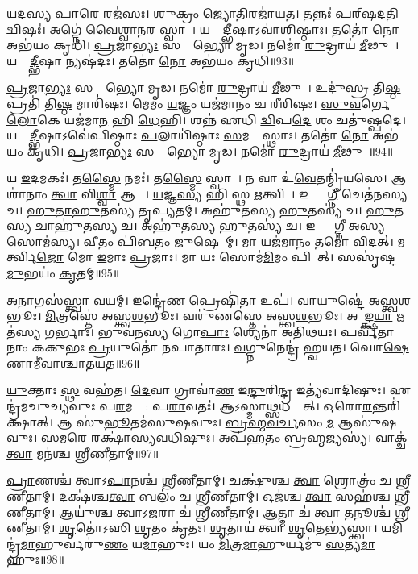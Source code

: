 𑌯\ul{𑌦}𑌸𑍍𑌯 \ul{𑌪𑌾}𑌰𑍇 𑌰𑌜॑𑌸𑌃।
\ul{𑌶𑍁}𑌕𑍍𑌰𑌂  𑌜𑍍𑌯𑍋\ul{𑌤𑌿}𑌰𑌜𑌾॑𑌯𑌤।
𑌤𑌨𑍍𑌨𑌃॑ 𑌪𑌰𑍍‌\mbox{}\ul{𑌷}𑌦\ul{𑌤𑌿} 𑌦𑍍𑌵𑌿𑌷𑌃॑।
𑌅𑌗𑍍𑌨𑍇॑ 𑌵𑍈𑌶𑍍𑌵𑌾𑌨\ul{𑌰} 𑌸𑍍𑌵𑌾𑌹𑌾᳚।
𑌯𑌸𑍍𑌮𑌾᳚\ul{𑌦𑍍𑌭𑍀}𑌷𑌾\-𑌽𑌵𑌾॑𑌶𑌿𑌷𑍍𑌠𑌾𑌃।
𑌤𑌤𑍋॑ \ul{𑌨𑍋} 𑌅𑌭॑𑌯𑌂 𑌕𑍃𑌧𑌿।
\ul{𑌪𑍍𑌰}𑌜𑌾\ul{𑌭𑍍𑌯𑌃} 𑌸𑌰𑍍𑌵𑌾᳚𑌭𑍍𑌯𑍋 𑌮𑍃𑌡।
𑌨𑌮𑍋॑ \ul{𑌰𑍁}𑌦𑍍𑌰𑌾𑌯॑ \ul{𑌮𑍀}𑌢𑍁𑌷𑍇᳚।
𑌯𑌸𑍍𑌮𑌾᳚\ul{𑌦𑍍𑌭𑍀}𑌷𑌾 𑌨𑍍𑌯𑌷॑𑌦𑌃।
𑌤𑌤𑍋॑ \ul{𑌨𑍋} 𑌅𑌭॑𑌯𑌂 𑌕𑍃𑌧𑌿॥93॥

\ul{𑌪𑍍𑌰}𑌜𑌾\ul{𑌭𑍍𑌯𑌃} 𑌸𑌰𑍍𑌵𑌾᳚𑌭𑍍𑌯𑍋 𑌮𑍃𑌡।
𑌨𑌮𑍋॑ \ul{𑌰𑍁}𑌦𑍍𑌰𑌾𑌯॑ \ul{𑌮𑍀}𑌢𑍁𑌷𑍇᳚।
𑌉𑌦𑍁॑𑌸𑍍𑌰 𑌤𑌿\ul{𑌷𑍍𑌠} 𑌪𑍍𑌰𑌤𑌿॑ 𑌤𑌿\ul{𑌷𑍍𑌠} 𑌮𑌾𑌰𑌿॑𑌷𑌃।
𑌮𑍇𑌮𑌂 \ul{𑌯}𑌜𑍍𑌞𑌂 𑌯𑌜॑𑌮𑌾𑌨𑌂 𑌚 𑌰𑍀𑌰𑌿𑌷𑌃।
\ul{𑌸𑍁}\ul{𑌵}𑌰𑍍𑌗𑍇 \ul{𑌲𑍋}𑌕𑍇 𑌯𑌜॑𑌮𑌾\ul{𑌨}\ul{} 𑌹𑌿 \ul{𑌧𑍇}𑌹𑌿।
𑌶𑌨𑍍𑌨॑ 𑌏𑌧𑌿 \ul{𑌦𑍍𑌵𑌿}𑌪\ul{𑌦𑍇} 𑌶𑌂 𑌚𑌤𑍁॑𑌷𑍍𑌪𑌦𑍇।
𑌯𑌸𑍍𑌮𑌾᳚\ul{𑌦𑍍𑌭𑍀}𑌷𑌾\-𑌽𑌵𑍇॑𑌪𑌿𑌷𑍍𑌠𑌾𑌃 \ul{𑌪}𑌲𑌾𑌯𑌿॑𑌷𑍍𑌠𑌾𑌃 \ul{𑌸}𑌮𑌜𑍍𑌞𑌾᳚𑌸𑍍𑌥𑌾𑌃।
𑌤𑌤𑍋॑ \ul{𑌨𑍋} 𑌅𑌭॑𑌯𑌂 𑌕𑍃𑌧𑌿।
\ul{𑌪𑍍𑌰}𑌜𑌾\ul{𑌭𑍍𑌯𑌃} 𑌸𑌰𑍍𑌵𑌾᳚𑌭𑍍𑌯𑍋 𑌮𑍃𑌡।
𑌨𑌮𑍋॑ \ul{𑌰𑍁}𑌦𑍍𑌰𑌾𑌯॑ \ul{𑌮𑍀}𑌢𑍁𑌷𑍇᳚॥94॥

𑌯 \ul{𑌇}𑌦𑌮𑌕𑌃॑।
𑌤\ul{𑌸𑍍𑌮𑍈} 𑌨𑌮𑌃॑।
𑌤\ul{𑌸𑍍𑌮𑍈} 𑌸𑍍𑌵𑌾𑌹𑌾᳚।
𑌨 𑌵𑌾 𑌉॑\ul{𑌵𑍇}𑌤𑌨𑍍𑌮𑍍𑌰𑌿॑𑌯𑌸𑍇।
𑌆𑌶𑌾॑𑌨𑌾𑌂 \ul{𑌤𑍍𑌵𑌾} 𑌵𑌿\ul{𑌶𑍍𑌵𑌾} 𑌆𑌶𑌾𑌃᳚।
\ul{𑌯}𑌜𑍍𑌞\ul{𑌸𑍍𑌯} 𑌹𑌿 𑌸𑍍𑌥 \ul{𑌋}𑌤𑍍𑌵𑌿𑌯𑍗᳚।
𑌇𑌨𑍍𑌦𑍍𑌰𑌾᳚\ul{𑌗𑍍𑌨𑍀} 𑌚𑍇𑌤॑𑌨𑌸𑍍𑌯 𑌚।
\ul{𑌹𑍁}\ul{𑌤𑌾}\ul{𑌹𑍁}𑌤𑌸𑍍𑌯॑ 𑌤𑍃𑌪𑍍𑌯𑌤𑌮𑍍।
𑌅𑌹𑍁॑𑌤𑌸𑍍𑌯 \ul{𑌹𑍁}𑌤𑌸𑍍𑌯॑ 𑌚।
\ul{𑌹𑍁}𑌤\ul{𑌸𑍍𑌯} 𑌚𑌾𑌹𑍁॑𑌤𑌸𑍍𑌯 𑌚।
𑌅𑌹𑍁॑𑌤𑌸𑍍𑌯 \ul{𑌹𑍁}𑌤𑌸𑍍𑌯॑ 𑌚।
𑌇𑌨𑍍𑌦𑍍𑌰𑌾᳚𑌗𑍍𑌨𑍀 \ul{𑌅}𑌸𑍍𑌯 𑌸𑍋𑌮॑𑌸𑍍𑌯।
\ul{𑌵𑍀}𑌤𑌂 𑌪𑌿॑𑌬𑌤𑌂 \ul{𑌜𑍁}𑌷𑍇𑌥𑌾᳚𑌮𑍍।
𑌮𑌾 𑌯𑌜॑𑌮𑌾\ul{𑌨𑌂} 𑌤𑌮𑍋॑ 𑌵𑌿𑌦𑌤𑍍।
𑌮𑌰𑍍𑌤𑍍𑌵𑌿\ul{𑌜𑍋} 𑌮𑍋 \ul{𑌇}𑌮𑌾𑌃 \ul{𑌪𑍍𑌰}𑌜𑌾𑌃।
𑌮𑌾 𑌯𑌃 𑌸𑍋𑌮॑\ul{𑌮𑌿}𑌮𑌂 𑌪𑌿𑌬𑌾᳚𑌤𑍍।
𑌸𑌸𑍃॑𑌷𑍍𑌟\ul{𑌮𑍁}𑌭𑌯𑌂॑ \ul{𑌕𑍃}𑌤𑌮𑍍॥95॥\anuvakamend[\ul{𑌕𑍃}\ul{𑌧𑌿} \ul{𑌮𑍀}𑌢𑍁𑌷𑍇\-𑌽𑌹𑍁॑𑌤𑌸𑍍𑌯 𑌚 \ul{𑌸}𑌪𑍍𑌤 𑌚॑]

\ul{𑌅}\ul{𑌨𑌾}𑌗𑌸॑𑌸𑍍𑌤𑍍𑌵𑌾 \ul{𑌵}𑌯𑌮𑍍।
𑌇𑌨𑍍𑌦𑍍𑌰𑍇॑\ul{𑌣} 𑌪𑍍𑌰𑍇𑌷𑌿॑\ul{𑌤𑌾} 𑌉𑌪॑।
\ul{𑌵𑌾}𑌯𑍁𑌷𑍍𑌟𑍇॑ 𑌅𑌸𑍍𑌤𑍍𑌵\ul{𑌶}𑌭𑍂𑌃।
\ul{𑌮𑌿}𑌤𑍍𑌰𑌸𑍍𑌤𑍇॑ 𑌅𑌸𑍍𑌤𑍍𑌵\ul{𑌶}𑌭𑍂𑌃।
𑌵𑌰𑍁॑𑌣𑌸𑍍𑌤𑍇 𑌅𑌸𑍍𑌤𑍍𑌵\ul{𑌶}𑌭𑍂𑌃।
𑌅𑌪𑌾᳚𑌙𑍍𑌕𑍍𑌷\ul{𑌯𑌾} 𑌋𑌤॑𑌸𑍍𑌯 𑌗𑌰𑍍𑌭𑌾𑌃।
𑌭𑍁𑌵॑𑌨𑌸𑍍𑌯 𑌗𑍋\ul{𑌪𑌾𑌃} 𑌶𑍍𑌯𑍇𑌨𑌾॑ 𑌅𑌤𑌿𑌥𑌯𑌃।
𑌪𑌰𑍍𑌵॑𑌤𑌾𑌨𑌾𑌂 𑌕𑌕𑍁𑌭𑌃 \ul{𑌪𑍍𑌰}𑌯𑍁𑌤𑍋॑ 𑌨𑌪𑌾𑌤𑌾𑌰𑌃।
\ul{𑌵}𑌗𑍍𑌨𑍁𑌨𑍇𑌨𑍍𑌦𑍍𑌰॑ 𑌹𑍍𑌵𑌯𑌤।
𑌘𑍋\ul{𑌷𑍇}𑌣𑌾𑌮𑍀॑𑌵𑌾𑌶𑍍𑌚𑌾𑌤𑌯𑌤॥96॥

\ul{𑌯𑍁}𑌕𑍍𑌤𑌾𑌃 \ul{𑌸𑍍𑌥} 𑌵𑌹॑𑌤।
\ul{𑌦𑍇}𑌵𑌾 𑌗𑍍𑌰𑌾𑌵𑌾॑\ul{𑌣} 𑌇\ul{𑌨𑍍𑌦𑍁}𑌰𑌿\ul{𑌨𑍍𑌦𑍍𑌰} 𑌇𑌤𑍍𑌯॑𑌵𑌾𑌦𑌿𑌷𑍁𑌃।
𑌏𑌨𑍍𑌦𑍍𑌰॑𑌮𑌚𑍁𑌚𑍍𑌯𑌵𑍁𑌃 𑌪\ul{𑌰}𑌮𑌸𑍍𑌯𑌾᳚: 𑌪\ul{𑌰𑌾}𑌵𑌤𑌃॑।
𑌆𑌽𑌸𑍍𑌮𑌾\ul{𑌥𑍍𑌸}𑌧𑌸𑍍𑌥𑌾᳚𑌤𑍍।
𑌓𑌰𑍋\ul{𑌰}𑌨𑍍𑌤𑌰𑌿॑𑌕𑍍𑌷𑌾𑌤𑍍।
𑌆 𑌸𑍁॑\ul{𑌭𑍂}𑌤𑌮॑𑌸𑍁𑌷𑌵𑍁𑌃।
\ul{𑌬𑍍𑌰}\ul{𑌹𑍍𑌮}\ul{𑌵}\ul{𑌰𑍍𑌚}𑌸𑌂 \ul{𑌮} 𑌆𑌸𑍁॑𑌷𑌵𑍁𑌃।
\ul{𑌸}\ul{𑌮}𑌰𑍇 𑌰𑌕𑍍𑌷𑌾॑𑌸𑍍𑌯𑌵𑌧𑌿𑌷𑍁𑌃।
𑌅𑌪॑𑌹𑌤𑌂 𑌬𑍍𑌰\ul{𑌹𑍍𑌮}𑌜𑍍𑌯𑌸𑍍𑌯॑।
𑌵𑌾𑌕𑍍𑌚॑ \ul{𑌤𑍍𑌵𑌾} 𑌮𑌨॑𑌶𑍍𑌚 𑌶𑍍𑌰𑍀𑌣𑍀𑌤𑌾𑌮𑍍॥97॥

\ul{𑌪𑍍𑌰𑌾}𑌣𑌶𑍍𑌚॑ 𑌤𑍍𑌵𑌾\-𑌽\ul{𑌪𑌾}𑌨𑌶𑍍𑌚॑ 𑌶𑍍𑌰𑍀𑌣𑍀𑌤𑌾𑌮𑍍।
𑌚𑌕𑍍𑌷𑍁॑𑌶𑍍𑌚 \ul{𑌤𑍍𑌵𑌾} 𑌶𑍍𑌰𑍋𑌤𑍍𑌰𑌂॑ 𑌚 𑌶𑍍𑌰𑍀𑌣𑍀𑌤𑌾𑌮𑍍।
𑌦𑌕𑍍𑌷॑𑌶𑍍𑌚\ul{𑌤𑍍𑌵𑌾} 𑌬𑌲𑌂॑ 𑌚 𑌶𑍍𑌰𑍀𑌣𑍀𑌤𑌾𑌮𑍍।
𑌓𑌜॑𑌶𑍍𑌚 \ul{𑌤𑍍𑌵𑌾} 𑌸𑌹॑𑌶𑍍𑌚 𑌶𑍍𑌰𑍀𑌣𑍀𑌤𑌾𑌮𑍍।
𑌆𑌯𑍁॑𑌶𑍍𑌚 𑌤𑍍𑌵𑌾\-𑌽\ul{𑌜}𑌰𑌾 𑌚॑ 𑌶𑍍𑌰𑍀𑌣𑍀𑌤𑌾𑌮𑍍।
\ul{𑌆}𑌤𑍍𑌮𑌾 𑌚॑ 𑌤𑍍𑌵𑌾 \ul{𑌤}𑌨𑍂𑌶𑍍𑌚॑ 𑌶𑍍𑌰𑍀𑌣𑍀𑌤𑌾𑌮𑍍।
\ul{𑌶𑍃}𑌤𑍋॑𑌽𑌸𑌿 \ul{𑌶𑍃}𑌤𑌂 𑌕𑍃॑𑌤𑌃।
\ul{𑌶𑍃}𑌤𑌾𑌯॑ 𑌤𑍍𑌵𑌾 \ul{𑌶𑍃}𑌤𑍇𑌭𑍍𑌯॑𑌸𑍍𑌤𑍍𑌵𑌾।
𑌯𑌮𑌿𑌨𑍍𑌦𑍍𑌰॑\ul{𑌮𑌾}𑌹𑍁𑌰𑍍𑌵𑌰𑍁॑\ul{𑌣𑌂} 𑌯\ul{𑌮𑌾}𑌹𑍁𑌃।
𑌯𑌂 \ul{𑌮𑌿}𑌤𑍍𑌰\ul{𑌮𑌾}𑌹𑍁𑌰𑍍𑌯𑌮𑍁॑ \ul{𑌸}𑌤𑍍𑌯\ul{𑌮𑌾}𑌹𑍁𑌃॥98॥

